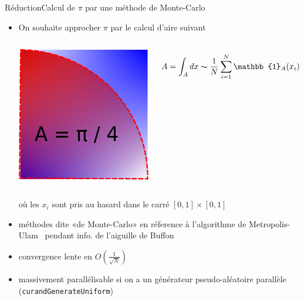 \documentclass[11pt,mathserif]{beamer}
\newcommand{\gezi}{\faLongArrowRight}
\newcommand{\argi}{\faLightbulbO}
\newcommand{\pozik}{\faSmileO}
\newcommand{\triste}{\faFrownO}
\begin{document}
\begin{frame}{Réduction}{Calcul de $\pi$ par une méthode de Monte-Carlo}
 \begin{itemize}[<+->]
   \item[\argi] On souhaite approcher $\pi$ par le calcul d'aire suivant
     \begin{columns}
       \column{6cm}
\begin{center}
  \includegraphics[width=0.5\linewidth]{fig/monteCarlo.eps}
\end{center}
       \column{4cm}
  $$A = \int_{A} dx \thicksim \frac{1}{N}\sum_{i=1}^N \mathbb{1}_{A}(x_i)$$
     \end{columns}
 où les $x_i$ sont pris au hasard dans le carré $[0,1] \times [0,1]$
  \item[\faBomb] méthodes dite «de Monte-Carlo» en réference à l'algorithme de Metropolis-Ulam \gezi\ pendant info. de l'aiguille de Buffon
  \item[\triste] convergence lente en $O(\frac{1}{\sqrt{N}})$
  \item[\pozik] massivement parallélisable si on a un générateur pseudo-aléatoire parallèle (\texttt{curandGenerateUniform})
  \end{itemize}
\end{frame}
\end{document}
